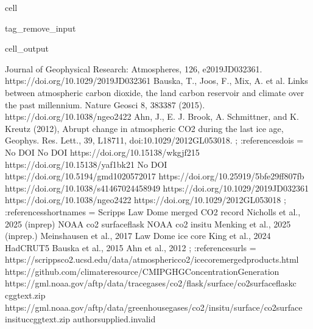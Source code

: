 \documentclass[letterpaper,10pt,english]{jupyterBook}
\begin{document}
\begin{sphinxuseclass}{cell}
\begin{sphinxuseclass}{tag_remove_input}
\begin{sphinxVerbatimOutput}
\begin{sphinxuseclass}{cell_output}
\begin{sphinxVerbatim}[commandchars=\\\{\}]
Journal of Geophysical Research: Atmospheres, 126, e2019JD032361.
https://doi.org/10.1029/2019JD032361 \PYGZhy{}\PYGZhy{}\PYGZhy{} Bauska, T., Joos, F., Mix, A. et al.
Links between atmospheric carbon dioxide, the land carbon reservoir and climate
over the past millennium. Nature Geosci 8, 383\PYGZhy{}387 (2015).
https://doi.org/10.1038/ngeo2422 \PYGZhy{}\PYGZhy{}\PYGZhy{} Ahn, J., E. J. Brook, A. Schmittner, and
K. Kreutz (2012), Abrupt change in atmospheric CO2 during the last ice age,
Geophys. Res. Lett., 39, L18711, doi:10.1029/2012GL053018.\PYGZdq{} ;
		:references\PYGZus{}dois = \PYGZdq{}No DOI \PYGZhy{}\PYGZhy{}\PYGZhy{} No DOI \PYGZhy{}\PYGZhy{}\PYGZhy{}
https://doi.org/10.15138/wkgj\PYGZhy{}f215 \PYGZhy{}\PYGZhy{}\PYGZhy{} https://doi.org/10.15138/yaf1\PYGZhy{}bk21 \PYGZhy{}\PYGZhy{}\PYGZhy{}
No DOI \PYGZhy{}\PYGZhy{}\PYGZhy{} https://doi.org/10.5194/gmd\PYGZhy{}10\PYGZhy{}2057\PYGZhy{}2017 \PYGZhy{}\PYGZhy{}\PYGZhy{}
https://doi.org/10.25919/5bfe29ff807fb \PYGZhy{}\PYGZhy{}\PYGZhy{}
https://doi.org/10.1038/s41467\PYGZhy{}024\PYGZhy{}45894\PYGZhy{}9 \PYGZhy{}\PYGZhy{}\PYGZhy{}
https://doi.org/10.1029/2019JD032361 \PYGZhy{}\PYGZhy{}\PYGZhy{} https://doi.org/10.1038/ngeo2422 \PYGZhy{}\PYGZhy{}\PYGZhy{}
https://doi.org/10.1029/2012GL053018\PYGZdq{} ;
		:references\PYGZus{}short\PYGZus{}names = \PYGZdq{}Scripps \PYGZhy{} Law Dome merged CO2 record
\PYGZhy{}\PYGZhy{}\PYGZhy{} Nicholls et al., 2025 (in\PYGZhy{}prep) \PYGZhy{}\PYGZhy{}\PYGZhy{} NOAA co2 surface\PYGZhy{}flask \PYGZhy{}\PYGZhy{}\PYGZhy{} NOAA co2
in\PYGZhy{}situ \PYGZhy{}\PYGZhy{}\PYGZhy{} Menking et al., 2025 (in\PYGZhy{}prep.) \PYGZhy{}\PYGZhy{}\PYGZhy{} Meinshausen et al., 2017 \PYGZhy{}\PYGZhy{}\PYGZhy{}
Law Dome ice core \PYGZhy{}\PYGZhy{}\PYGZhy{} King et al., 2024 \PYGZhy{}\PYGZhy{}\PYGZhy{} HadCRUT5 \PYGZhy{}\PYGZhy{}\PYGZhy{} Bauska et al., 2015
\PYGZhy{}\PYGZhy{}\PYGZhy{} Ahn et al., 2012\PYGZdq{} ;
		:references\PYGZus{}urls =
\PYGZdq{}https://scrippsco2.ucsd.edu/data/atmospheric\PYGZus{}co2/icecore\PYGZus{}merged\PYGZus{}products.html
\PYGZhy{}\PYGZhy{}\PYGZhy{} https://github.com/climate\PYGZhy{}resource/CMIP\PYGZhy{}GHG\PYGZhy{}Concentration\PYGZhy{}Generation \PYGZhy{}\PYGZhy{}\PYGZhy{}
https://gml.noaa.gov/aftp/data/trace\PYGZus{}gases/co2/flask/surface/co2\PYGZus{}surface\PYGZhy{}flask\PYGZus{}c
cgg\PYGZus{}text.zip \PYGZhy{}\PYGZhy{}\PYGZhy{}
https://gml.noaa.gov/aftp/data/greenhouse\PYGZus{}gases/co2/in\PYGZhy{}situ/surface/co2\PYGZus{}surface\PYGZhy{}
insitu\PYGZus{}ccgg\PYGZus{}text.zip \PYGZhy{}\PYGZhy{}\PYGZhy{} author\PYGZhy{}supplied.invalid \PYGZhy{}\PYGZhy{}\PYGZhy{}

\end{sphinxVerbatim}
\end{sphinxuseclass}
\end{sphinxVerbatimOutput}
\end{sphinxuseclass}
\end{sphinxuseclass}
\end{document}

